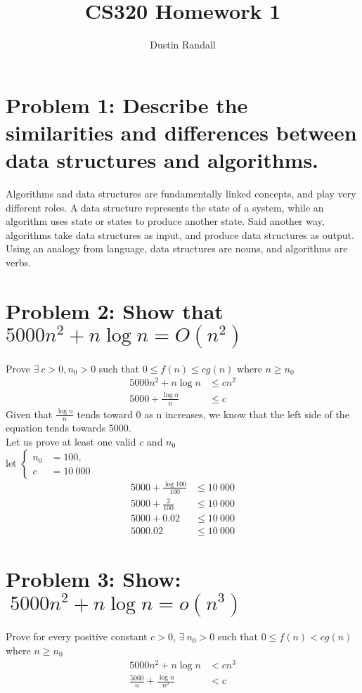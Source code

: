 \documentclass{article}
\begin{document}
\title{CS320 Homework 1}
\author{Dustin Randall}
\maketitle

\section{Problem 1: Describe the similarities and differences between data structures and algorithms.}
    Algorithms and data structures are fundamentally linked concepts, and play very different roles.
    A data structure represents the state of a system, while an algorithm uses state or states to produce another state.
    Said another way, algorithms take data structures as input, and produce data structures as output.
    Using an analogy from language, data structures are nouns, and algorithms are verbs.

\section{Problem 2: Show that \(5000n^2 + n \log n = O(n^2)\)}
    Prove \(\exists \medspace c > 0, n_0 > 0 \) such that \(0 \le f(n) \le c g(n) \) where \(n \ge n_0\) \\
    \begin{align}
        5000n^2 + n \log n & \le c n^2 \\
        5000 + \frac{\log n}{n} & \le c
    \end{align}
    Given that \(\frac{\log n}{n}\) tends toward 0 as n increases, we know that the left side of the equation tends towards 5000. \\
    Let us prove at least one valid \(c\) and \(n_0\) \\
    let 
    \(\begin{cases}
        n_0 & = 100, \\
        c & = 10~000
    \end{cases}\)    
    \begin{align}
        5000 + \frac{\log 100}{100} & \le 10~000 \\
        5000 + \frac{2}{100} & \le 10~000 \\
        5000 + 0.02 & \le 10~000 \\
        5000.02 & \le 10~000
    \end{align}

\section{Problem 3: Show: \(\medspace 5000n^2 + n \log n = o(n^3)\)}
    Prove for every positive constant \(c > 0\), \(\exists \medspace n_0 > 0 \) such that \(0 \le f(n) < cg(n) \) where \(n \ge n_0\) \\
    \begin{align}
        5000n^2 + n \log n & < c n^3 \\
        \frac{5000}{n} + \frac{\log n}{n^2} & < c
    \end{align}
\end{document}
